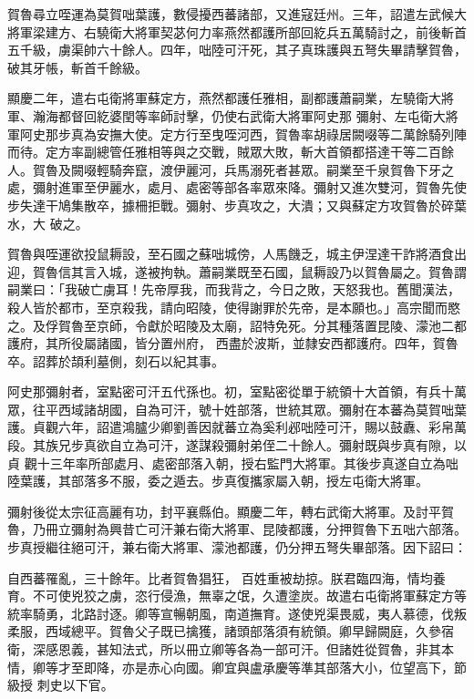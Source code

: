 \begin{pinyinscope}
 賀魯尋立咥運為莫賀咄葉護，數侵擾西蕃諸部，又進寇廷州。三年，詔遣左武候大將軍梁建方、右驍衛大將軍契苾何力率燕然都護所部回紇兵五萬騎討之，前後斬首五千級，虜渠帥六十餘人。四年，咄陸可汗死，其子真珠護與五弩失畢請擊賀魯，破其牙帳，斬首千餘級。



 顯慶二年，遣右屯衛將軍蘇定方，燕然都護任雅相，副都護蕭嗣業，左驍衛大將軍、瀚海都督回紇婆閏等率師討擊，仍使右武衛大將軍阿史那
 彌射、左屯衛大將軍阿史那步真為安撫大使。定方行至曳咥河西，賀魯率胡祿居闕啜等二萬餘騎列陣而待。定方率副總管任雅相等與之交戰，賊眾大敗，斬大首領都搭達干等二百餘人。賀魯及闕啜輕騎奔竄，渡伊麗河，兵馬溺死者甚眾。嗣業至千泉賀魯下牙之處，彌射進軍至伊麗水，處月、處密等部各率眾來降。彌射又進次雙河，賀魯先使步失達干鳩集散卒，據柵拒戰。彌射、步真攻之，大潰；又與蘇定方攻賀魯於碎葉水，大
 破之。



 賀魯與咥運欲投鼠耨設，至石國之蘇咄城傍，人馬饑乏，城主伊涅達干詐將酒食出迎，賀魯信其言入城，遂被拘執。蕭嗣業既至石國，鼠耨設乃以賀魯屬之。賀魯謂嗣業曰：「我破亡虜耳！先帝厚我，而我背之，今日之敗，天怒我也。舊聞漢法，殺人皆於都市，至京殺我，請向昭陵，使得謝罪於先帝，是本願也。」高宗聞而愍之。及俘賀魯至京師，令獻於昭陵及太廟，詔特免死。分其種落置昆陵、濛池二都護府，其所役屬諸國，皆分置州府，
 西盡於波斯，並隸安西都護府。四年，賀魯卒。詔葬於頡利墓側，刻石以紀其事。



 阿史那彌射者，室點密可汗五代孫也。初，室點密從單于統領十大首領，有兵十萬眾，往平西域諸胡國，自為可汗，號十姓部落，世統其眾。彌射在本蕃為莫賀咄葉護。貞觀六年，詔遣鴻臚少卿劉善因就蕃立為奚利邲咄陸可汗，賜以鼓纛、彩帛萬段。其族兄步真欲自立為可汗，遂謀殺彌射弟侄二十餘人。彌射既與步真有隙，以貞
 觀十三年率所部處月、處密部落入朝，授右監門大將軍。其後步真遂自立為咄陸葉護，其部落多不服，委之遁去。步真復攜家屬入朝，授左屯衛大將軍。



 彌射後從太宗征高麗有功，封平襄縣伯。顯慶二年，轉右武衛大將軍。及討平賀魯，乃冊立彌射為興昔亡可汗兼右衛大將軍、昆陵都護，分押賀魯下五咄六部落。步真授繼往絕可汗，兼右衛大將軍、濛池都護，仍分押五弩失畢部落。因下詔曰：



 自西蕃罹亂，三十餘年。比者賀魯猖狂，
 百姓重被劫掠。朕君臨四海，情均養育。不可使兇狡之虜，恣行侵漁，無辜之氓，久遭塗炭。故遣右屯衛將軍蘇定方等統率騎勇，北路討逐。卿等宣暢朝風，南道撫育。遂使兇渠畏威，夷人慕德，伐叛柔服，西域總平。賀魯父子既已擒獲，諸頭部落須有統領。卿早歸闕庭，久參宿衛，深感恩義，甚知法式，所以冊立卿等各為一部可汗。但諸姓從賀魯，非其本情，卿等才至即降，亦是赤心向國。卿宜與盧承慶等準其部落大小，位望高下，節級授
 刺史以下官。




\end{pinyinscope}
